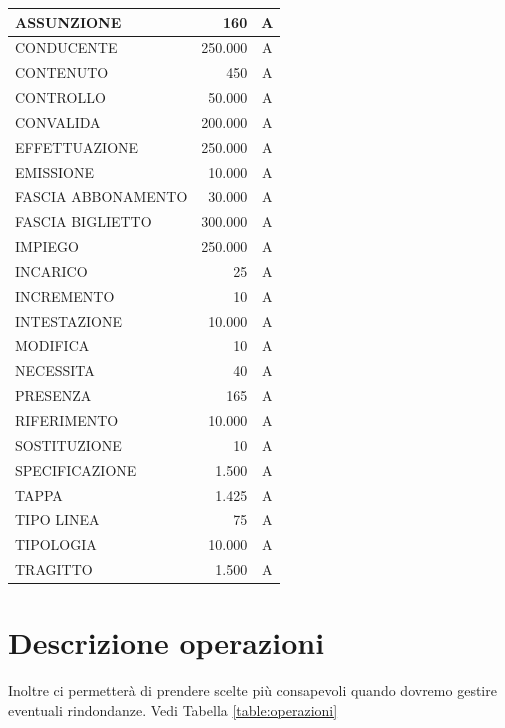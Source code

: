 \documentclass[12pt,a4paper]{report}
\begin{document}
\begin{longtable}{|p{7.5cm}|r|c|}
\hline
ASSUNZIONE & 160 & A \\
\hline
CONDUCENTE & 250.000 & A \\
\hline
CONTENUTO & 450 & A \\
\hline
CONTROLLO & 50.000 & A \\
\hline
CONVALIDA & 200.000 & A \\
\hline
EFFETTUAZIONE & 250.000 & A \\
\hline
EMISSIONE & 10.000 & A \\
\hline
FASCIA ABBONAMENTO & 30.000 & A \\
\hline
FASCIA BIGLIETTO & 300.000 & A \\
\hline
IMPIEGO & 250.000 & A \\
\hline
INCARICO & 25 & A \\
\hline
INCREMENTO & 10 & A \\
\hline
INTESTAZIONE & 10.000 & A \\
\hline
MODIFICA & 10 & A \\
\hline
NECESSITA & 40 & A \\
\hline
PRESENZA & 165 & A \\
\hline
RIFERIMENTO & 10.000 & A \\
\hline
SOSTITUZIONE & 10 & A \\
\hline
SPECIFICAZIONE & 1.500 & A \\
\hline
TAPPA & 1.425 & A \\
\hline
TIPO LINEA & 75 & A \\
\hline
TIPOLOGIA & 10.000 & A \\
\hline
TRAGITTO & 1.500 & A \\
\hline
\end{longtable}


\section{Descrizione operazioni}
Inoltre ci permetterà di prendere scelte più consapevoli quando dovremo gestire eventuali rindondanze. Vedi Tabella \ref{table:operazioni}
\end{document}
